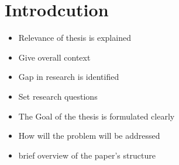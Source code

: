 \chapter{Introdcution}
\label{cha:introduction}

\begin{itemize}
    \item Relevance of thesis is explained
    \item Give overall context
    \item Gap in research is identified
    \item Set research questions
    \item The Goal of the thesis is formulated clearly
    \item How will the problem will be addressed
    \item brief overview of the paper's structure
\end{itemize}